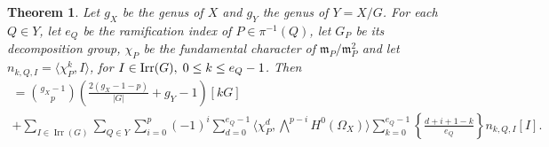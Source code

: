 \documentclass[10pt]{amsart}
\newtheorem{theorem}{Theorem}[subsection]
\theoremstyle{definition}
\begin{document}
\begin{theorem}\label{th:mainwedge}
Let $g_X$ be the genus of $X$ and $g_Y$ the genus of $Y=X/G$. For each $Q\in Y$, let $e_Q$ be the ramification index of $P\in\pi^{-1}(Q)$, let $G_P$ be its decomposition group, $\chi_P$ be the fundamental character of $\mathfrak{m}_P/\mathfrak{m}_P^2$ and let $n_{k,Q,I}=\langle \chi_P^k,I\rangle$, for $I\in{\rm Irr}(G), \;0\leq k\leq e_Q-1$. Then
\begin{multline*}
[H^0\big(\bigwedge^p\mathcal{M}_{\Omega_X}\otimes\Omega_X^{\otimes 2}\big)]
=
\binom{g_X-1}{p} \left( \frac{2(g_X-1-p)}{|G|}
+
g_Y-1\right)
[kG]\\
  +
\sum_{I \in \operatorname{Irr}(G)} \sum_{Q \in Y} \sum_{i=0}^p (-1)^i \sum_{d=0}^{e_Q-1} 
\langle \chi_P^{d}, \bigwedge^{p-i}H^0(\Omega_X) \rangle 
\sum_{k=0}^{e_Q-1} \left\{ \frac{d+i+1-k}{e_Q} \right\} n_{k,Q,I} [I].
\end{multline*}
\end{theorem}
\end{document}
